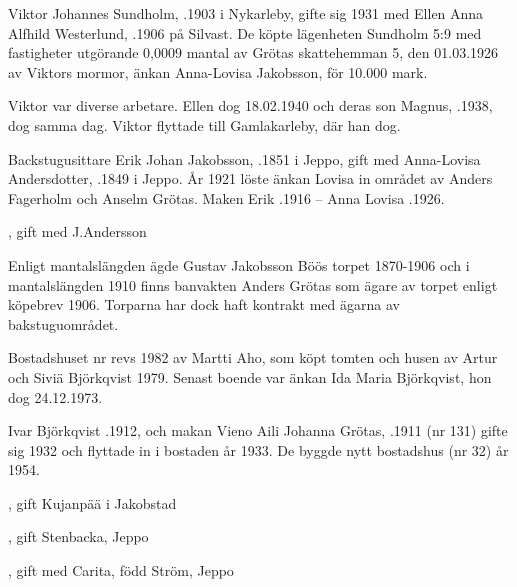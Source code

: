 Viktor Johannes Sundholm, .1903 i Nykarleby, gifte sig 1931 med Ellen Anna Alfhild Westerlund, .1906 på Silvast. De köpte lägenheten Sundholm 5:9 med fastigheter utgörande 0,0009 mantal av Grötas skattehemman 5, den 01.03.1926 av Viktors mormor, änkan Anna-Lovisa Jakobsson, för 10.000 mark.

Viktor var diverse arbetare. Ellen dog 18.02.1940 och deras son Magnus, .1938, dog samma dag. Viktor flyttade till Gamlakarleby, där han dog.


Backstugusittare Erik Johan Jakobsson, .1851 i Jeppo, gift med Anna-Lovisa Andersdotter, .1849 i Jeppo. År 1921 löste änkan Lovisa in området av Anders Fagerholm och Anselm Grötas.
Maken Erik .1916  --  Anna Lovisa .1926.
\begin{jhchildren}
  \item {}
  \item {}, gift med J.Andersson
  \item {}
  \item {}
  \item {}
\end{jhchildren}
Enligt  mantalslängden ägde Gustav Jakobsson Böös torpet 1870-1906 och i mantalslängden 1910 finns banvakten Anders Grötas som ägare av torpet enligt köpebrev 1906. Torparna har dock haft kontrakt med ägarna av bakstuguområdet.




Bostadshuset nr  revs 1982 av Martti Aho, som köpt tomten och husen av Artur och Siviä Björkqvist 1979. Senast boende var änkan Ida Maria Björkqvist, hon dog 24.12.1973.

Ivar Björkqvist .1912, och makan Vieno Aili Johanna Grötas, .1911 (nr 131) gifte sig 1932 och flyttade in i bostaden år 1933. De byggde nytt bostadshus (nr 32) år 1954.
\begin{jhchildren}
  \item {}, gift Kujanpää i Jakobstad
  \item {}, gift Stenbacka, Jeppo
  \item {}, gift med Carita, född Ström, Jeppo
\end{jhchildren}


